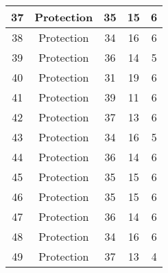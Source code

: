 \documentclass[results.tex]{subfiles}
\begin{document}
\begin{center}
\begin{tabular}{| c || c | c | c | c |}
            \hline
            37                      & Protection                   & 35                     & 15                      & 6                    \\
            \hline
            38                      & Protection                   & 34                     & 16                      & 6                    \\
            \hline
            39                      & Protection                   & 36                     & 14                      & 5                    \\
            \hline
            40                      & Protection                   & 31                     & 19                      & 6                    \\
            \hline
            41                      & Protection                   & 39                     & 11                      & 6                    \\
            \hline
            42                      & Protection                   & 37                     & 13                      & 6                    \\
            \hline
            43                      & Protection                   & 34                     & 16                      & 5                    \\
            \hline
            44                      & Protection                   & 36                     & 14                      & 6                    \\
            \hline
            45                      & Protection                   & 35                     & 15                      & 6                    \\
            \hline
            46                      & Protection                   & 35                     & 15                      & 6                    \\
            \hline
            47                      & Protection                   & 36                     & 14                      & 6                    \\
            \hline
            48                      & Protection                   & 34                     & 16                      & 6                    \\
            \hline
            49                      & Protection                   & 37                     & 13                      & 4                    \\
            \hline
        \end{tabular}
    \end{center}
\end{document}
